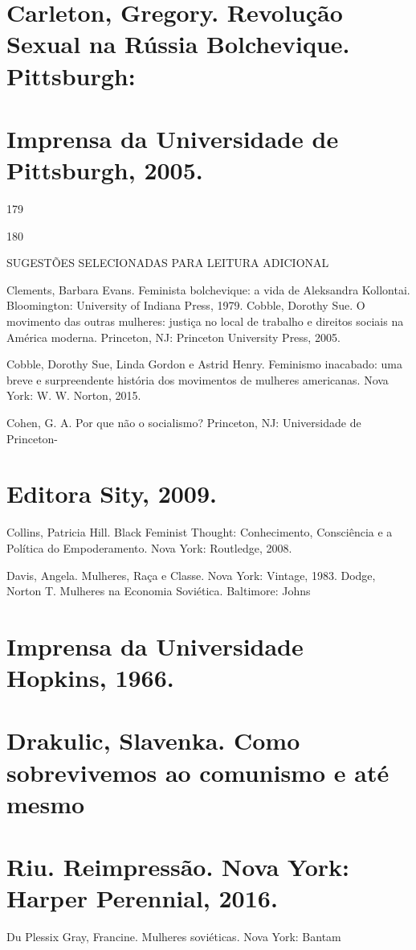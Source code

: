 \section{Carleton, Gregory. Revolução Sexual na Rússia Bolchevique. Pittsburgh:}
 \par 
\section{Imprensa da Universidade de Pittsburgh, 2005.}
 \par 
179
 \par 
180
 \par 
SUGESTÕES SELECIONADAS PARA LEITURA ADICIONAL
 \par 
Clements, Barbara Evans. Feminista bolchevique: a vida de Aleksandra Kollontai. Bloomington: University of Indiana Press, 1979. Cobble, Dorothy Sue. O movimento das outras mulheres: justiça no local de trabalho e direitos sociais na América moderna. Princeton, NJ: Princeton University Press, 2005.
 \par 
Cobble, Dorothy Sue, Linda Gordon e Astrid Henry. Feminismo inacabado: uma breve e surpreendente história dos movimentos de mulheres americanas. Nova York: W. W. Norton, 2015.
 \par 
Cohen, G. A. Por que não o socialismo? Princeton, NJ: Universidade de Princeton-
 \par 
\section{Editora Sity, 2009.}
 \par 
Collins, Patricia Hill. Black Feminist Thought: Conhecimento, Consciência e a Política do Empoderamento. Nova York: Routledge, 2008.
 \par 
Davis, Angela. Mulheres, Raça e Classe. Nova York: Vintage, 1983. Dodge, Norton T. Mulheres na Economia Soviética. Baltimore: Johns
 \par 
\section{Imprensa da Universidade Hopkins, 1966.}
 \par 
\section{Drakulic, Slavenka. Como sobrevivemos ao comunismo e até mesmo}
 \par 
\section{Riu. Reimpressão. Nova York: Harper Perennial, 2016.}
 \par 
Du Plessix Gray, Francine. Mulheres soviéticas. Nova York: Bantam
 \par 
